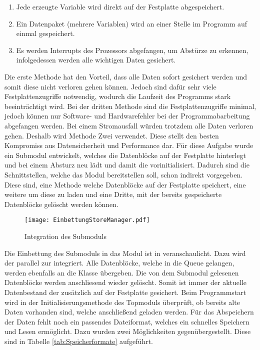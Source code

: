 \begin{enumerate}
\item Jede erzeugte Variable wird direkt auf der Festplatte abgespeichert.
\item Ein Datenpaket (mehrere Variablen) wird an einer Stelle im Programm auf
einmal gespeichert.
\item Es werden Interrupts des Prozessors abgefangen, um Abst{\"u}rze zu erkennen,
infolgedessen werden alle wichtigen Daten gesichert.
\end{enumerate}

Die erste Methode hat den Vorteil, dass alle Daten sofort gesichert werden und
somit diese nicht verloren gehen k{\"o}nnen. Jedoch sind daf{\"u}r sehr viele
Festplattenzugriffe notwendig, wodurch die Laufzeit des Programms stark
beeintr{\"a}chtigt wird. Bei der dritten Methode sind die Festplattenzugriffe
minimal, jedoch k{\"o}nnen nur Software- und Hardwarefehler bei der
Programmabarbeitung abgefangen werden. Bei einem Stromausfall w{\"u}rden
trotzdem alle Daten verloren gehen. Deshalb wird Methode Zwei verwendet. Diese
stellt den besten Kompromiss aus Datensicherheit und Performance dar. \newline
F{\"u}r diese Aufgabe wurde ein Submodul entwickelt, welches die Datenbl{\"o}cke
auf der Festplatte hinterlegt und bei einem Absturz neu l{\"a}dt und damit die
 vorinitialisiert. Dadurch sind die Schnittstellen,
welche das Modul bereitstellen soll, schon indirekt vorgegeben. Diese sind, eine
Methode welche Datenbl{\"o}cke auf der Festplatte speichert, eine weitere um
diese zu laden und eine Dritte, mit der bereits gespeicherte Datenbl{\"o}cke
gel{\"o}scht werden k{\"o}nnen.

\begin{figure}[H]
\centering
\texttt{[image: EinbettungStoreManager.pdf]}
\caption{Integration des Submoduls }
\label{fig:EinbettungStoreManager}
\end{figure}

Die Einbettung des Submoduls  in das Modul  ist
in  veranschaulicht. Dazu wird der
 parallel zur  integriert. Alle
Datenbl{\"o}cke, welche in die Queue gelangen, werden ebenfalls an die
Klasse  {\"u}bergeben. Die von dem Submodul 
gelesenen Datenbl{\"o}cke werden anschliesend wieder gel{\"o}scht. Somit ist immer der
aktuelle Datenbestand der 
zus{\"a}tzlich auf der Festplatte gesichert. Beim Programmstart wird in der
Initialisierungsmethode des Topmoduls {\"u}berpr{\"u}ft, ob bereits alte Daten vorhanden
sind, welche anschlie{\ss}end geladen werden. \newline
F{\"u}r das Abspeichern der
Daten fehlt noch ein passendes Dateiformat, welches ein schnelles Speichern und
Lesen erm{\"o}glicht. Dazu wurden zwei M{\"o}glichkeiten gegen{\"u}bergestellt. Diese sind
in Tabelle \ref{tab:Speicherformate} aufgef{\"u}hrt.

